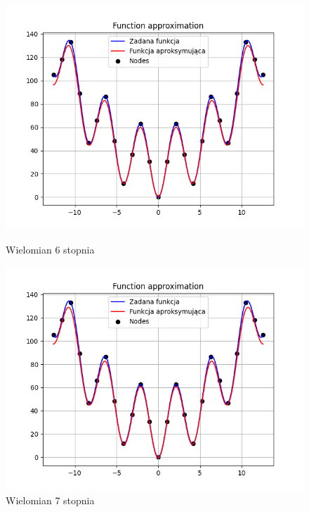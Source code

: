 \documentclass{article}
\begin{document}
\begin{figure}[H]
  \begin{minipage}[b]{0.49\textwidth}
    \begin{minipage}[b]{\textwidth}
      \includegraphics[width=\textwidth]{img19.png}
      \caption{Wielomian 6 stopnia}
    \end{minipage}
    \vspace*{\fill}
    \begin{minipage}[b]{\textwidth}
      \includegraphics[width=\textwidth]{img20.png}
      \caption{Wielomian 7 stopnia}
    \end{minipage}
  \end{minipage}
  \hfill
  \begin{minipage}[b]{0.49\textwidth}

\end{minipage}
\end{figure}
\end{document}

